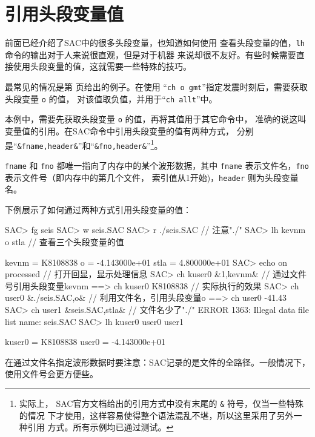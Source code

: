 \section{引用头段变量值}
前面已经介绍了SAC中的很多头段变量，也知道如何使用 
查看头段变量的值，\texttt{lh} 命令的输出对于人来说很直观，但是对于机器
来说却很不友好。有些时候需要直接使用头段变量的值，这就需要一些特殊的技巧。

最常见的情况是第 \pageref{code:origin-time} 页给出的例子。在使用
``\texttt{ch o gmt}''指定发震时刻后，需要获取头段变量 \texttt{o} 的值，
对该值取负值，并用于``\texttt{ch allt}''中。

本例中，需要先获取头段变量 \texttt{o} 的值，再将其值用于其它命令中，
准确的说这叫变量值的引用。在SAC命令中引用头段变量的值有两种方式，
分别是``\verb|&fname,header&|''和``\verb|&fno,header&|''\footnote{实际上，
SAC官方文档给出的引用方式中没有末尾的 \verb|&| 符号，仅当一些特殊的情况
下才使用，这样容易使得整个语法混乱不堪，所以这里采用了另外一种引用
方式。所有示例均已通过测试。}。

\texttt{fname} 和 \texttt{fno} 都唯一指向了内存中的某个波形数据，其中
\texttt{fname} 表示文件名，\texttt{fno} 表示文件号（即内存中的第几个文件，
索引值从1开始)，\texttt{header} 则为头段变量名。

下例展示了如何通过两种方式引用头段变量的值：
\begin{SACCode}
SAC> fg seis
SAC> w seis.SAC
SAC> r ./seis.SAC               // 注意"./"
SAC> lh kevnm o stla            // 查看三个头段变量的值

     kevnm = K8108838
         o = -4.143000e+01
      stla = 4.800000e+01
SAC> echo on processed          // 打开回显，显示处理信息
SAC> ch kuser0 &1,kevnm&        // 通过文件号引用头段变量kevnm
 ==>  ch kuser0 K8108838        // 实际执行的效果
SAC> ch user0 &./seis.SAC,o&    // 利用文件名，引用头段变量o
 ==>  ch user0 -41.43
SAC> ch user1 &seis.SAC,stla&   // 文件名少了"./"
 ERROR 1363: Illegal data file list name: seis.SAC
SAC> lh kuser0 user0 user1

     kuser0 = K8108838
     user0 = -4.143000e+01
\end{SACCode}

在通过文件名指定波形数据时要注意：SAC记录的是文件的全路径。一般情况下，
使用文件号会更方便些。
